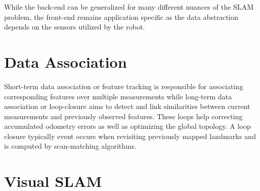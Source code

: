 While the back-end can be generalized for many different nuances of the SLAM problem, the front-end remains application specific as the data abstraction depends on the sensors utilized by the robot.


\section{Data Association}\label{dataAssociation}
Short-term data association or feature tracking is responsible for associating corresponding features over multiple measurements while long-term data association or loop-closure aims to detect and link similarities between current measurements and previously observed features. These loops help correcting accumulated odometry errors as well as optimizing the global topology. 
A loop closure typically event occurs when revisiting previously mapped landmarks and is computed by scan-matching algorithms.

\section{Visual SLAM}


